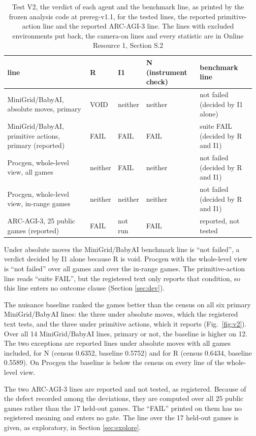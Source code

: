 \documentclass[twocolumn]{svjour3}
\begin{document}
\begin{table}
\caption{Test V2, the verdict of each agent and the benchmark line, as printed by the frozen analysis code at prereg-v1.1, for the tested lines, the reported primitive-action line and the reported ARC-AGI-3 line. The lines with excluded environments put back, the camera-on lines and every statistic are in Online Resource 1, Section S.2}
\label{tab:v2}
\begin{tabularx}{\textwidth}{>{\raggedright\arraybackslash}Xlll>{\raggedright\arraybackslash}X}
\hline
line & R & I1 & N (instrument check) & benchmark line \\
\hline
MiniGrid/BabyAI, absolute moves, primary & VOID & neither & neither & not failed (decided by I1 alone) \\
MiniGrid/BabyAI, primitive actions, primary (reported) & FAIL & FAIL & FAIL & suite FAIL (decided by R and I1) \\
Procgen, whole-level view, all games & neither & FAIL & neither & not failed (decided by R and I1) \\
Procgen, whole-level view, in-range games & neither & neither & neither & not failed (decided by R and I1) \\
ARC-AGI-3, 25 public games (reported) & FAIL & not run & FAIL & reported, not tested \\
\hline
\end{tabularx}
\end{table}

Under absolute moves the MiniGrid/BabyAI benchmark line is ``not
failed'', a verdict decided by I1 alone because R is void. Procgen with
the whole-level view is ``not failed'' over all games and over the
in-range games. The primitive-action line reads ``suite FAIL'', but the
registered text only reports that condition, so this line enters no
outcome clause (Section \ref{sec:dev}).

The nuisance baseline ranked the games better than the census on all six
primary MiniGrid/BabyAI lines: the three under absolute moves, which the
registered text tests, and the three under primitive actions, which it
reports (Fig.~\ref{fig:v2}). Over all 14 MiniGrid/BabyAI lines, primary
or not, the baseline is higher on 12. The two exceptions are reported
lines under absolute moves with all games included, for N (census
0.6352, baseline 0.5752) and for R (census 0.6434, baseline 0.5589). On
Procgen the baseline is below the census on every line of the
whole-level view.

The two ARC-AGI-3 lines are reported and not tested, as registered.
Because of the defect recorded among the deviations, they are computed
over all 25 public games rather than the 17 held-out games. The ``FAIL''
printed on them has no registered meaning and enters no gate. The line
over the 17 held-out games is given, as exploratory, in Section
\ref{sec:explore}.
\end{document}
